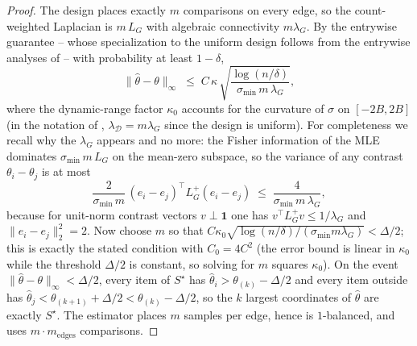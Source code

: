 \documentclass[11pt]{article}
\theoremstyle{definition}
\newcommand{\lG}{\lambda_G}
\begin{document}
\begin{proof}
The design places exactly $m$ comparisons on every edge, so the count-weighted Laplacian is $m\,L_G$ with algebraic connectivity $m\lG$.  By the entrywise guarantee -- whose specialization to the uniform design follows from the entrywise analyses of \cite{yang2026graphmonotone,li2021ellinftybounds} -- with probability at least $1-\delta$,
\[
\|\hat\theta-\theta\|_\infty\;\le\; C\,\kappa\,\sqrt{\frac{\log(n/\delta)}{\sigma_{\min}\,m\,\lG}} ,
\]
where the dynamic-range factor $\kappa_0$ accounts for the curvature of $\sigma$ on $[-2B,2B]$ (in the notation of \cite{yang2026graphmonotone}, $\lambda_{\mathcal D}=m\lG$ since the design is uniform).  For completeness we recall why the $\lG$ appears and no more: the Fisher information of the MLE dominates $\sigma_{\min}\, m\,L_G$ on the mean-zero subspace, so the variance of any contrast $\theta_i-\theta_j$ is at most
\[
\frac{2}{\sigma_{\min}\,m}\,(e_i-e_j)^\top L_G^{+}(e_i-e_j)
\;\le\; \frac{4}{\sigma_{\min}\,m\,\lG},
\]
because for unit-norm contrast vectors $v\perp\mathbf 1$ one has $v^\top L_G^{+}v\le 1/\lG$ and $\|e_i-e_j\|_2^2=2$.
Now choose $m$ so that $C\kappa_0\sqrt{\log(n/\delta)/(\sigma_{\min}m\lG)}<\Delta/2$; this is exactly the stated condition with $C_0=4C^2$ (the error bound is linear in $\kappa_0$ while the threshold $\Delta/2$ is constant, so solving for $m$ squares $\kappa_0$).  On the event $\|\hat\theta-\theta\|_\infty<\Delta/2$, every item of $S^\star$ has $\hat\theta_i>\theta_{(k)}-\Delta/2$ and every item outside has $\hat\theta_j<\theta_{(k+1)}+\Delta/2<\theta_{(k)}-\Delta/2$, so the $k$ largest coordinates of $\hat\theta$ are exactly $S^\star$.  The estimator places $m$ samples per edge, hence is $1$-balanced, and uses $m\cdot m_{\mathrm{edges}}$ comparisons.
\end{proof}
\end{document}
